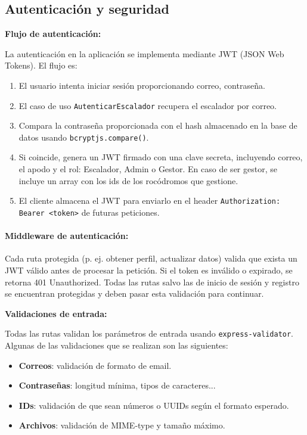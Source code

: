 \subsection{Autenticación y seguridad}

\textbf{Flujo de autenticación:}

La autenticación en la aplicación se implementa mediante JWT (JSON Web Tokens). El flujo es:

\begin{enumerate}
  \item El usuario intenta iniciar sesión proporcionando correo, contraseña.
  \item El caso de uso \texttt{AutenticarEscalador} recupera el escalador por correo.
  \item Compara la contraseña proporcionada con el hash almacenado en la base de datos usando \texttt{bcryptjs.compare()}.
  \item Si coincide, genera un JWT firmado con una clave secreta, incluyendo correo, el apodo y el rol: Escalador, Admin o Gestor. En caso de ser gestor, se incluye un array con los ids de los rocódromos que gestione.
  \item El cliente almacena el JWT para enviarlo en el header \texttt{Authorization: Bearer <token>} de futuras peticiones.
\end{enumerate}

\paragraph{Middleware de autenticación:}

Cada ruta protegida (p. ej. obtener perfil, actualizar datos) valida que exista un JWT válido antes de procesar la petición. Si el token es inválido o expirado, se retorna 401 Unauthorized. Todas las rutas salvo las de inicio de sesión y registro se encuentran protegidas y deben pasar esta validación para continuar.

\textbf{Validaciones de entrada:}

Todas las rutas validan los parámetros de entrada usando \texttt{express-validator}. Algunas de las validaciones que se realizan son las siguientes:

\begin{itemize}
  \item \textbf{Correos}: validación de formato de email.
  \item \textbf{Contraseñas}: longitud mínima, tipos de caracteres...
  \item \textbf{IDs}: validación de que sean números o UUIDs según el formato esperado.
  \item \textbf{Archivos}: validación de MIME-type y tamaño máximo.
\end{itemize}

